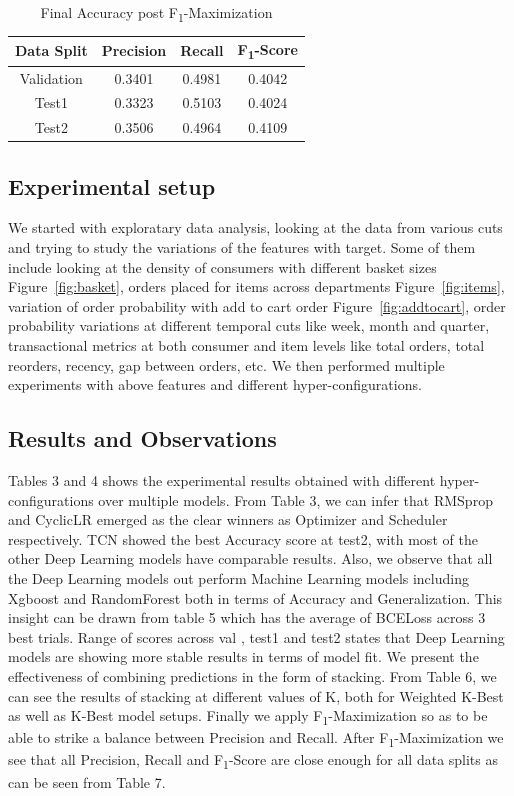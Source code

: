 \begin{table}[t]
\caption{Final Accuracy post F\textsubscript{1}-Maximization}
\vspace{0.1 in}
\centering
\resizebox{3.3in}{!}
{%
\begin{tabular}{|c|c|c|c|}
\hline
{\bf Data Split} & {\bf Precision} & {\bf Recall} & {\bf F\textsubscript{1}-Score} \\ 
\hline\hline 
Validation	  	 &  0.3401 &  0.4981 &  0.4042  \\ \hline
Test1	  		 &  0.3323 &  0.5103 &  0.4024  \\ \hline
Test2	  		 & 0.3506 &  0.4964 &  0.4109 \\ \hline
\end{tabular}
}
\label{tab:Fscore}
\end{table}

\subsection{Experimental setup}
We started with exploratary data analysis, looking at the data from various cuts and 
trying to study the variations of the features with target. Some of them include looking at the 
density of consumers with different basket sizes Figure~\ref{fig:basket}, orders placed for items 
across departments Figure~\ref{fig:items}, variation of order probability with add to cart order Figure~\ref{fig:addtocart},
order probability variations at different temporal cuts like week, month and quarter, transactional metrics at both
consumer and item levels like total orders, total reorders, recency, gap between orders, etc.
We then performed multiple experiments with above features and different hyper-configurations.

\subsection{Results and Observations}
Tables 3 and 4 shows the experimental results obtained with different hyper-configurations over multiple models.
From Table 3, we can infer that RMSprop and CyclicLR emerged as the clear winners as 
Optimizer and Scheduler respectively. TCN showed the best Accuracy score at test2, with most of the other Deep
Learning models have comparable results. Also, we observe that all the Deep Learning models out perform Machine Learning 
models including Xgboost and RandomForest both in terms of Accuracy and Generalization. This insight can be drawn from 
table 5 which has the average of BCELoss across 3 best trials. Range of scores across val , test1 and test2 states 
that Deep Learning models are showing more stable results in terms of model fit. 
We present the effectiveness of combining predictions in the form of stacking. From Table 6, we can see the 
results of stacking at different values of K, both for Weighted K-Best as well as K-Best model setups. Finally we 
apply F\textsubscript{1}-Maximization so as to be able to strike a balance between Precision and Recall.
After F\textsubscript{1}-Maximization we see that all Precision, Recall and F\textsubscript{1}-Score 
are close enough for all data splits as can be seen from Table 7.

